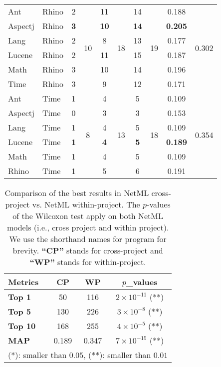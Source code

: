 \begin{table*}[t!]
\begin{tabular}{|l|l|c|c|c|c|c|c|c|c|}
    \hline
    Ant   & Rhino & 2     & \multirow{6}[2]{*}{10} & 11    & \multirow{6}[2]{*}{18} & 14    & \multirow{6}[2]{*}{19} & 0.188 & \multirow{6}[2]{*}{0.302} \\
    Aspectj & Rhino & \textbf{3}     &       & \textbf{10}    &       & \textbf{14}    &       & \textbf{0.205} &  \\
    Lang  & Rhino & 2     &       & 8     &       & 13    &       & 0.177 &  \\
    Lucene & Rhino & 2     &       & 11    &       & 15    &       & 0.187 &  \\
    Math  & Rhino & 3     &       & 10    &       & 14    &       & 0.196 &  \\
    Time  & Rhino & 3     &       & 9     &       & 12    &       & 0.171 &  \\
    \hline
    Ant   & Time  & 1     & \multirow{6}[2]{*}{8} & 4     & \multirow{6}[2]{*}{13} & 5     & \multirow{6}[2]{*}{18} & 0.109  & \multirow{6}[2]{*}{0.354} \\
    Aspectj & Time  & 0     &       & 3     &       & 3     &       & 0.153 &  \\
    Lang  & Time  & 1     &       & 4     &       & 5     &       & 0.109  &  \\
    Lucene & Time  & \textbf{1}     &       & \textbf{4}     &       & \textbf{ 5 }    &       &\textbf{0.189} &  \\
    Math  & Time  & 1     &       & 4     &       & 5     &       & 0.109  &  \\
    Rhino & Time  & 1     &       & 5     &       & 6     &       & 0.191 &  \\
    \hline
    \end{tabular}%
  \label{tab:cross_proj}%
\end{table*}%

\begin{table}[t!]
	\centering
	\caption{Comparison of the best results in NetML cross-project vs. NetML within-project. The $p$-values of the Wilcoxon test apply on both NetML models (i.e., cross project and within project). We use the shorthand names for program for brevity. \textbf{``CP''} stands for cross-project and \textbf{``WP''} stands for within-project.}
	\begin{tabular}{|l|c|c|c|}
		\hline
		\textbf{Metrics} & \textbf{CP} & \textbf{WP} & \textbf{$p$\_values} \\
		\hline
		\hline
		\textbf{Top 1} & 50    & 116     & $ 2 \times 10^{-11}$ (**) \\
		\textbf{Top 5} & 130   & 226   & $ 3 \times 10^{-8}$ (**)\\
		\textbf{Top 10} & 168   & 255   & $ 4 \times 10^{-5}$ (**)\\
		\textbf{MAP} & 0.189 & 0.347 & $ 7 \times 10^{-15}$ (**) \\
		\hline
		\multicolumn{4}{l}{(*): smaller than $0.05$, (**): smaller than $0.01$}
	\end{tabular}%
	\label{tab:best_cross_proj}%
\end{table}%

